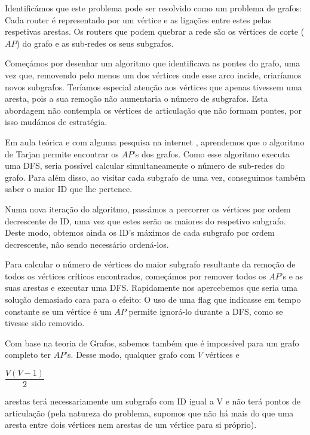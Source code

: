 \documentclass[12pt]{article}
\begin{document}
    \par
    Identificámos que este problema pode ser resolvido como um problema de grafos:
    Cada router é representado por um vértice e as ligações entre estes pelas respetivas 
    arestas. Os routers que podem quebrar a rede são os vértices de corte ($AP$)
    do grafo e as sub-redes os seus subgrafos.
    \par\bigskip
    Começámos por desenhar um algoritmo que identificava as pontes do grafo, uma vez
    que, removendo pelo menos um dos vértices onde esse arco incide, criaríamos novos 
    subgrafos. Teríamos especial atenção aos vértices que apenas tivessem uma aresta,
    pois a sua remoção não aumentaria o número de subgrafos. Esta abordagem não contempla
    os vértices de articulação que não formam pontes, por isso mudámos de estratégia.
    \par
    Em aula teórica e com alguma pesquisa na internet\cite{geeksforgeeks, hackerearth}
    , aprendemos que o algoritmo de 
    Tarjan permite encontrar os $AP$'s dos grafos. Como esse algoritmo executa uma DFS, 
    seria possível calcular simultaneamente o número de sub-redes do grafo. Para além disso,
    ao visitar cada subgrafo de uma vez, conseguimos também saber o maior ID que lhe pertence.
    \par
    Numa nova iteração do algoritmo, passámos a percorrer os vértices por ordem decrescente de 
    ID, uma vez que estes serão os maiores do respetivo subgrafo. Deste modo, obtemos ainda os 
    ID's máximos de cada subgrafo por ordem decrescente, não sendo necessário ordená-los.
    \par
    Para calcular o número de vértices do maior subgrafo resultante da 
    remoção de todos os vértices críticos encontrados, começámos por  
    remover todos os $AP$'s e as suas arestas e executar uma DFS.
    Rapidamente nos apercebemos que seria uma solução demasiado cara para o efeito: O uso de uma
    flag que indicasse em tempo constante se um vértice é um $AP$ permite ignorá-lo durante a DFS,
    como se tivesse sido removido.
    
    \par\bigskip
    Com base na teoria de Grafos, sabemos também que é impossível para um grafo completo ter 
    $AP$'s. Desse modo, qualquer grafo com $V$ vértices e 
    \begin{small}$\dfrac{V(V-1)}{2}$\end{small} arestas
    terá necessariamente um subgrafo com ID igual a V e não terá pontos de articulação
    (pela natureza do problema, supomos que não há mais do que uma aresta entre dois vértices
    nem arestas de um vértice para si próprio).
\end{document}
